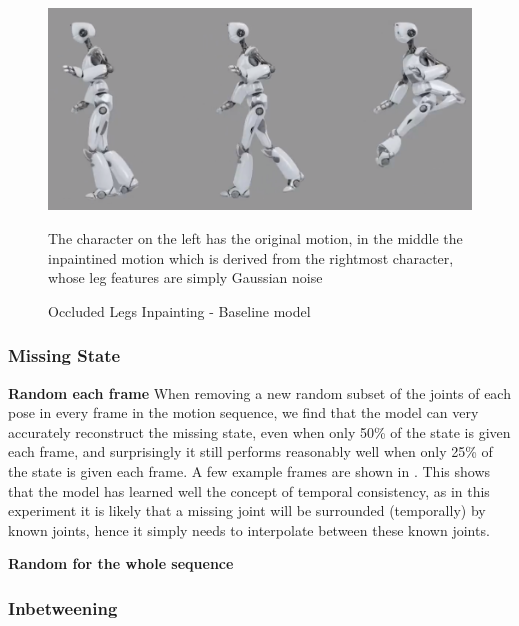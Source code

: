 \begin{figure}[!ht]
    \centering
    \includegraphics[width=1\textwidth]{Figures/diffusion/results/basline_inpainting_legs.png}
    \caption{Occluded Legs Inpainting - Baseline model}
    \label{fig:baseline_occluded_legs}
    \medskip
    \small
    The character on the left has the original motion, in the middle the inpaintined motion which is derived from the rightmost character, whose leg features are simply Gaussian noise
\end{figure}


\subsubsection{Missing State}
\textbf{Random each frame}
When removing a new random subset of the joints of each pose in every frame in the motion sequence, we find that the model can very accurately reconstruct the missing state, even when only 50\% of the state is given each frame, and surprisingly it still performs reasonably well when only 25\% of the state is given each frame. A few example frames are shown in . This shows that the model has learned well the concept of temporal consistency, as in this experiment it is likely that a missing joint will be surrounded (temporally) by known joints, hence it simply needs to interpolate between these known joints.


\textbf{Random for the whole sequence}


\subsubsection{Inbetweening}



